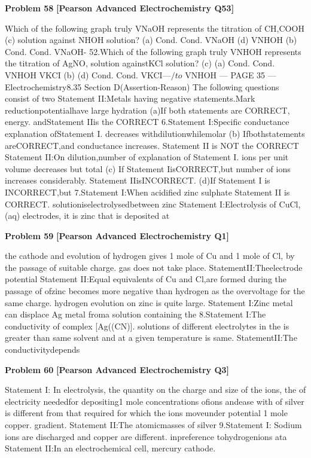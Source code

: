 \begin{problembox}
\textbf{Problem 58} \hfill \textbf{[Pearson Advanced Electrochemistry Q53]}
\label{q:ext-pearson-58}

Which of the following graph truly
VNaOH
represents the titration of CH,COOH
(c)
solution against NHOH solution?
(a)
Cond.
Cond.
VNaOH
(d)
VNHOH
(b)
Cond.
Cond.
VNaOH-
52.Which of the following graph truly
VNHOH
represents the titration of AgNO,
solution againstKCl solution?
(c)
(a)
Cond.
Cond.
VNHOH
VKCI
(b)
(d)
Cond.
Cond.
VKCI---$/to$
VNHOH
--- PAGE 35 ---
Electrochemistry8.35
Section D(Assertion-Reason)
The following questions consist of two
Statement II:Metals having negative
statements.Mark
reductionpotentialhave large hydration
(a)If both statements are CORRECT,
energy.
andStatement IIis the CORRECT
6.Statement I:Specific conductance
explanation ofStatement I.
decreases withdilutionwhilemolar
(b)
Ifbothstatements areCORRECT,and
conductance increases.
Statement II is NOT the CORRECT
Statement II:On dilution,number of
explanation of Statement I.
ions per unit volume decreases but total
(c)
If Statement IisCORRECT,but
number of ions increases considerably.
Statement IIisINCORRECT.
(d)If Statement I is INCORRECT,but
7.Statement I:When acidified zinc sulphate
Statement II is CORRECT.
solutioniselectrolysedbetween zinc
Statement I:Electrolysis of CuCl,(aq)
electrodes, it is zinc that is deposited at
\end{problembox}

\begin{problembox}
\textbf{Problem 59} \hfill \textbf{[Pearson Advanced Electrochemistry Q1]}
\label{q:ext-pearson-59}

the cathode and evolution of hydrogen
gives 1 mole of Cu and 1 mole of Cl, by
the passage of suitable charge.
gas does not take place.
StatementII:Theelectrode potential
Statement II:Equal equivalents of Cu
and Cl,are formed during the passage of
ofzinc becomes more negative than
hydrogen as the overvoltage for the
same charge.
hydrogen evolution on zinc is quite large.
Statement I:Zinc metal can displace Ag
metal froma solution containing the
8.Statement I:The conductivity of
complex [Ag((CN)].
solutions of different electrolytes in the
is greater than
same solvent and at a given temperature
is same.
StatementII:The conductivitydepends
\end{problembox}

\begin{problembox}
\textbf{Problem 60} \hfill \textbf{[Pearson Advanced Electrochemistry Q3]}
\label{q:ext-pearson-60}

Statement I: In electrolysis, the quantity
on the charge and size of the ions, the
of electricity neededfor depositing1 mole
concentrations ofions andease with
of silver is different from that required for
which the ions moveunder potential
1 mole copper.
gradient.
Statement II:The atomicmasses of silver
9.Statement I: Sodium ions are discharged
and copper are different.
inpreference tohydrogenions ata
Statement II:In an electrochemical cell,
mercury cathode.
\end{problembox}

